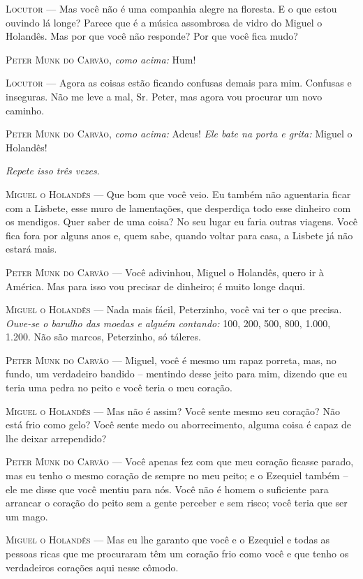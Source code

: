 \textsc{Locutor} --- Mas você não é uma companhia alegre na floresta. E o que
estou ouvindo lá longe? Parece que é a música assombrosa de vidro do
Miguel o Holandês. Mas por que você não responde? Por que você fica
mudo?

\textsc{Peter Munk do Carvão}, \emph{como acima:} Hum!

\textsc{Locutor} --- Agora as coisas estão ficando confusas demais para mim.
Confusas e inseguras. Não me leve a mal, Sr. Peter, mas agora vou
procurar um novo caminho.

\textsc{Peter Munk do Carvão}, \emph{como acima:} Adeus! \emph{Ele bate na porta
e grita:} Miguel o Holandês!

\emph{Repete isso três vezes.}

\textsc{Miguel o Holandês} --- Que bom que você veio. Eu também não aguentaria
ficar com a Lisbete, esse muro de lamentações, que desperdiça todo esse
dinheiro com os mendigos. Quer saber de uma coisa? No seu lugar eu faria
outras viagens. Você fica fora por alguns anos e, quem sabe, quando
voltar para casa, a Lisbete já não estará mais.

\textsc{Peter Munk do Carvão} --- Você adivinhou, Miguel o Holandês, quero ir à
América. Mas para isso vou precisar de dinheiro; é muito longe daqui.

\textsc{Miguel o Holandês} --- Nada mais fácil, Peterzinho, você vai ter o que
precisa. \emph{Ouve-se o barulho das moedas e alguém contando:} 100,
200, 500, 800, 1.000, 1.200. Não são marcos, Peterzinho, só táleres.

\textsc{Peter Munk do Carvão} --- Miguel, você é mesmo um rapaz porreta, mas, no
fundo, um verdadeiro bandido -- mentindo desse jeito para mim, dizendo
que eu teria uma pedra no peito e você teria o meu coração.

\textsc{Miguel o Holandês} --- Mas não é assim? Você sente mesmo seu coração? Não
está frio como gelo? Você sente medo ou aborrecimento, alguma coisa é
capaz de lhe deixar arrependido?

\textsc{Peter Munk do Carvão} --- Você apenas fez com que meu coração ficasse
parado, mas eu tenho o mesmo coração de sempre no meu peito; e o
Ezequiel também -- ele me disse que você mentiu para nós. Você não é
homem o suficiente para arrancar o coração do peito sem a gente perceber
e sem risco; você teria que ser um mago.

\textsc{Miguel o Holandês} --- Mas eu lhe garanto que você e o Ezequiel e todas as
pessoas ricas que me procuraram têm um coração frio como você e que
tenho os verdadeiros corações aqui nesse cômodo.

